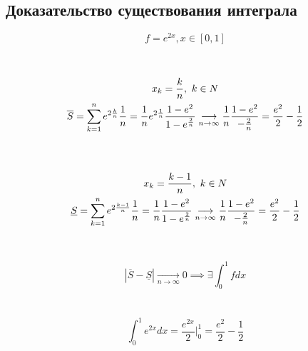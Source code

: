 \documentclass[12pt, a4paper]{article}
\begin{document}
\subsection{Доказательство существования интеграла}
\begin{equation}
    f=e^{2x}, x\in[0,1]
\end{equation}
\\
\\
\begin{equation}
    \begin{gathered}
        x_k= {k\over n}, k\in N \\
        \overline{S} = \sum\limits_{k=1}^{n} e^{2\frac{k}{n}} \frac{1}{n} = \frac{1}{n} {e^{2\frac{1}{n}} {{1 - e^2} \over {1 - e^{\frac{2}{n}}}}} \underset{n \to \infty}{\longrightarrow} \frac{1}{n} {{1 - e^2} \over -{\frac{2}{n}}} = \frac{e^2}{2} - \frac{1}{2}
    \end{gathered}
\end{equation}
\\
\\
\begin{equation}
    \begin{gathered}
        x_k= {{k - 1}\over n}, k\in N \\
        \underline{S} = \sum\limits_{k=1}^{n} e^{2\frac{k - 1}{n}} \frac{1}{n} = \frac{1}{n} {{1 - e^2} \over {1 - e^{\frac{2}{n}}}} \underset{n \to \infty}{\longrightarrow} \frac{1}{n} {{1 - e^2} \over -{\frac{2}{n}}} = \frac{e^2}{2} - \frac{1}{2}
    \end{gathered}
\end{equation}
\\
\\
\begin{equation}
    |\overline{S}-\underline{S}| \underset{n \to \infty}{\longrightarrow} 0 \implies \exists \int_{0}^{1} f dx
\end{equation}
\\
\\
\begin{equation}
    \int_0^1 e^{2x} dx = \frac{e^{2x}}{2}\bigg|_0^1 = \frac{e^2}{2} - \frac{1}{2}
\end{equation}
\end{document}
